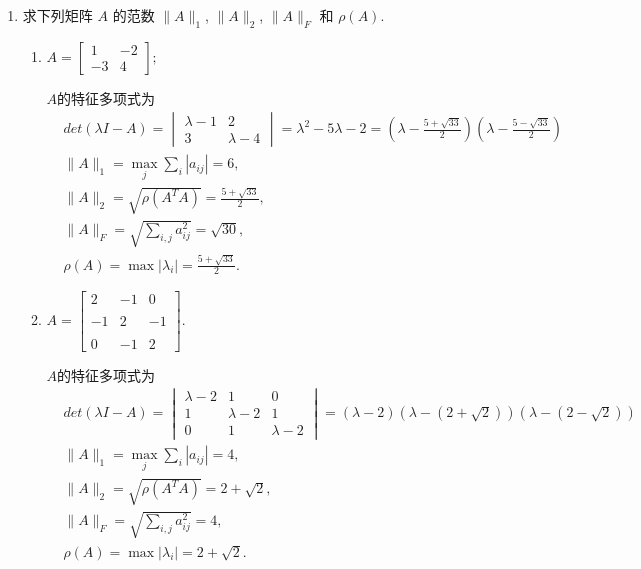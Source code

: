 \documentclass[a4paper]{article}
\begin{document}
\begin{enumerate}
  \item 求下列矩阵 $A$ 的范数 $\|A\|_1$, $\|A\|_2$, $\|A\|_F$ 和 $\rho(A)$.
  \begin{enumerate}[label=（\arabic*）]
    \item $A=\left[\begin{array}{cc}1&-2\\-3&4\end{array}\right];$
    \begin{solution}
      $A$的特征多项式为
      \begin{align*}
        &det(\lambda I - A) = \begin{vmatrix}\lambda-1&2\\3&\lambda-4\end{vmatrix}= \lambda^2 - 5\lambda - 2=(\lambda-\frac{5+\sqrt{33}}{2})(\lambda-\frac{5-\sqrt{33}}{2})\\
        &\|A\|_1=\max_j\sum_i|a_{ij}|=6,\\
        &\|A\|_2=\sqrt{\rho(A^TA)}=\frac{5+\sqrt{33}}{2},\\
        &\|A\|_F=\sqrt{\sum_{i,j}a_{ij}^2}=\sqrt{30},\\
        &\rho(A)=\max|\lambda_i|=\frac{5+\sqrt{33}}{2}.
      \end{align*}
    \end{solution}
    \item $A=\begin{bmatrix}2&-1&0\\\\-1&2&-1\\\\0&-1&2\end{bmatrix}.$
    \begin{solution}
      $A$的特征多项式为
      \begin{align*}
        &det(\lambda I - A) = \begin{vmatrix}\lambda-2&1&0\\1&\lambda-2&1\\0&1&\lambda-2\end{vmatrix}=(\lambda-2)(\lambda-(2+\sqrt{2}))(\lambda-(2-\sqrt{2}))\\
        &\|A\|_1=\max_j\sum_i|a_{ij}|=4,\\
        &\|A\|_2=\sqrt{\rho(A^TA)}=2+\sqrt{2},\\
        &\|A\|_F=\sqrt{\sum_{i,j}a_{ij}^2}=4,\\
        &\rho(A)=\max|\lambda_i|=2+\sqrt{2}.
      \end{align*}
    \end{solution}
  \end{enumerate}


\end{enumerate}
\end{document}
